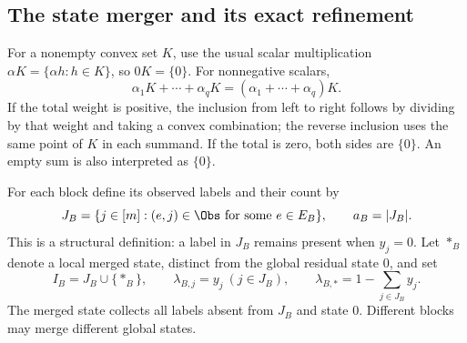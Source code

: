 \subsection{The state merger and its exact refinement}\label{subsec:state-merger}
For a nonempty convex set $K$, use the usual scalar multiplication
$\alpha K=\{\alpha h:h\in K\}$, so $0K=\{0\}$. For nonnegative scalars,
\begin{equation}\label{eq:homothetic-merger}
 \alpha_1K+\cdots+\alpha_qK
       =(\alpha_1+\cdots+\alpha_q)K.
\end{equation}
If the total weight is positive, the inclusion from left to right follows
by dividing by that weight and taking a convex combination; the reverse
inclusion uses the same point of $K$ in each summand. If the total is zero,
both sides are $\{0\}$. An empty sum is also interpreted as $\{0\}$.

For each block define its observed labels and their count by
\begin{equation}\label{eq:observed-labels}
 J_B=\{j\in[m]: (e,j)\in\Obs\text{ for some }e\in E_B\},
 \qquad a_B=|J_B|.
\end{equation}
This is a structural definition: a label in $J_B$ remains present when
$y_j=0$. Let $*_B$ denote a local merged state, distinct from the global
residual state $0$, and set
\begin{equation}\label{eq:merged-weight}
 I_B=J_B\cup\{*_B\},\qquad
 \lambda_{B,j}=y_j\ (j\in J_B),\qquad
 \lambda_{B,*}=1-\sum_{j\in J_B}y_j.
\end{equation}
The merged state collects all labels absent from $J_B$ and state $0$.
Different blocks may merge different global states.

